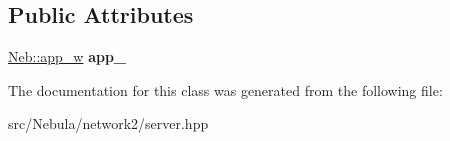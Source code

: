 \subsection*{\-Public \-Attributes}
\begin{DoxyCompactItemize}
\item 
\hypertarget{classNeb_1_1network_1_1server_acdaabbd7a113b9866506eb840fb9a1bc}{\hyperlink{classNeb_1_1weak__ptr}{\-Neb\-::app\-\_\-w} {\bfseries app\-\_\-}}\label{classNeb_1_1network_1_1server_acdaabbd7a113b9866506eb840fb9a1bc}

\end{DoxyCompactItemize}


\-The documentation for this class was generated from the following file\-:\begin{DoxyCompactItemize}
\item 
src/\-Nebula/network2/server.\-hpp\end{DoxyCompactItemize}
